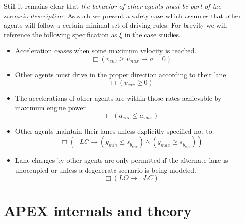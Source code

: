 Still it remains clear that {\it the behavior of other agents must be part of the scenario description.} As such we present a safety case which assumes that other agents will follow a certain minimal set of driving rules. For brevity we will reference the following specification as $\xi$ in the case studies.%

\begin{itemize}
	\item Acceleration ceases when some maximum velocity is reached.
	\begin{equation}
		\Box \left( v_{env} \geq v_{max} \to a = 0 \right)
	\end{equation}
	\item Other agents must drive in the proper direction according to their lane.
	\begin{equation}
		\Box \left( v_{env} \geq 0 \right)
	\end{equation}
	\item The accelerations of other agents are within those rates achievable by maximum engine power
	\begin{equation}
		\Box \left( a_{env} \leq a_{max}\right)
	\end{equation}
	\item Other agents maintain their lanes unless explicitly specified not to.
	\begin{equation}
		\Box \left( \neg LC \to \left( y_{min} \leq s_{y_{env}} \right) \wedge \left( y_{max} \geq s_{y_{env}} \right) \right)
	\end{equation}
	\item Lane changes by other agents are only permitted if the alternate lane is unoccupied or unless a degenerate scenario is being modeled.
	\begin{equation}
		\Box \left( LO \to \neg LC \right)
	\end{equation}
	
\end{itemize}

\section{APEX internals and theory}
\label{sec:apex internals}

